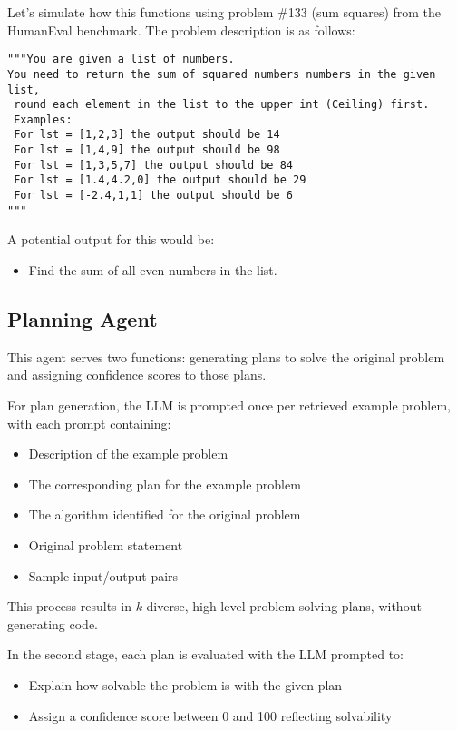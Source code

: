 \documentclass[11pt,a4paper]{article}
\begin{document}
Let’s simulate how this functions using problem \#133 (sum squares) from the HumanEval benchmark. The problem description is as follows:

\begin{verbatim}
"""You are given a list of numbers.
You need to return the sum of squared numbers numbers in the given list,
 round each element in the list to the upper int (Ceiling) first.
 Examples:
 For lst = [1,2,3] the output should be 14
 For lst = [1,4,9] the output should be 98
 For lst = [1,3,5,7] the output should be 84
 For lst = [1.4,4.2,0] the output should be 29
 For lst = [-2.4,1,1] the output should be 6
"""
\end{verbatim}

A potential output for this would be:
\begin{itemize}
  \item Find the sum of all even numbers in the list.
\end{itemize}

\subsection{Planning Agent}
This agent serves two functions: generating plans to solve the original problem and assigning confidence scores to those plans.

For plan generation, the LLM is prompted once per retrieved example problem, with each prompt containing:
\begin{itemize}
  \item Description of the example problem
  \item The corresponding plan for the example problem
  \item The algorithm identified for the original problem
  \item Original problem statement
  \item Sample input/output pairs
\end{itemize}

This process results in $k$ diverse, high-level problem-solving plans, without generating code.

In the second stage, each plan is evaluated with the LLM prompted to:
\begin{itemize}
  \item Explain how solvable the problem is with the given plan
  \item Assign a confidence score between 0 and 100 reflecting solvability
\end{itemize}
\end{document}
